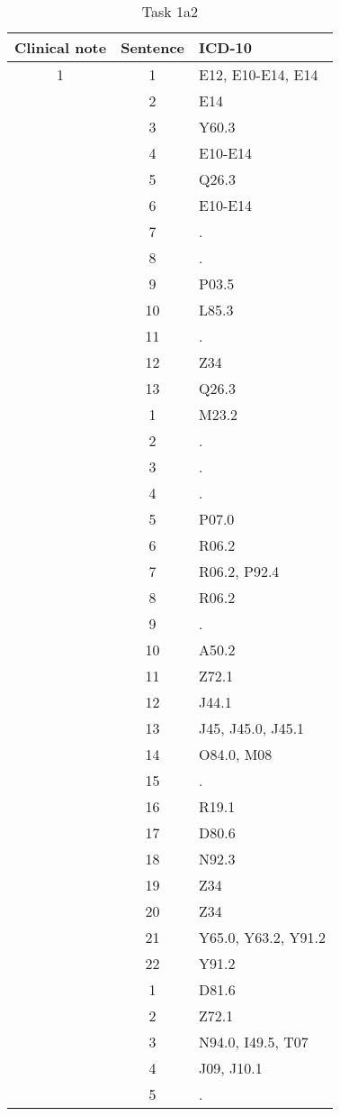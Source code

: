 \begin{table}[htbp] \footnotesize \center
\caption{Task 1a2\label{tab:task1a2}}
\begin{tabular}{c c l}
    \toprule
    Clinical note & Sentence & ICD-10 \\
    \midrule
	1 & 1 & E12, E10-E14, E14 \\
	 & 2 & E14 \\
	 & 3 & Y60.3 \\
	 & 4 & E10-E14 \\
	 & 5 & Q26.3 \\
	 & 6 & E10-E14 \\
	 & 7 & . \\
	 & 8 & . \\
	 & 9 & P03.5 \\
	 & 10 & L85.3 \\
	 & 11 & . \\
	 & 12 & Z34 \\
	 & 13 & Q26.3 \\
	\addlinespace
	2 & 1 & M23.2 \\
	 & 2 & . \\
	 & 3 & . \\
	 & 4 & . \\
	 & 5 & P07.0 \\
	 & 6 & R06.2 \\
	 & 7 & R06.2, P92.4 \\
	 & 8 & R06.2 \\
	 & 9 & . \\
	 & 10 & A50.2 \\
	 & 11 & Z72.1 \\
	 & 12 & J44.1 \\
	 & 13 & J45, J45.0, J45.1 \\
	 & 14 & O84.0, M08 \\
	 & 15 & . \\
	 & 16 & R19.1 \\
	 & 17 & D80.6 \\
	 & 18 & N92.3 \\
	 & 19 & Z34 \\
	 & 20 & Z34 \\
	 & 21 & Y65.0, Y63.2, Y91.2 \\
	 & 22 & Y91.2 \\
	\addlinespace
	3 & 1 & D81.6 \\
	 & 2 & Z72.1 \\
	 & 3 & N94.0, I49.5, T07 \\
	 & 4 & J09, J10.1 \\
	 & 5 & . \\

\end{tabular}
\end{table}
